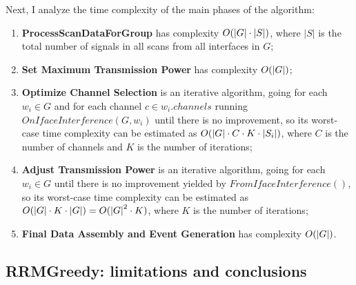 Next, I analyze the time complexity of the main phases of the algorithm:

\begin{enumerate}
    \item \textbf{ProcessScanDataForGroup} has complexity $O(\lvert{G}\rvert \cdot \lvert S \rvert)$, where $\lvert S \rvert$ is the total number of signals in all scans from all interfaces in $G$;
    \item \textbf{Set Maximum Transmission Power} has complexity $O(\lvert{G}\rvert)$;
    \item \textbf{Optimize Channel Selection} is an iterative algorithm, going for each $w_i \in G$ and for each channel $c \in w_i.channels$ running $OnIfaceInterference(G, w_i)$ until there is no improvement, so its worst-case time complexity can be estimated as $O(\lvert{G}\rvert \cdot C \cdot K \cdot \lvert{S_i}\rvert)$, where $C$ is the number of channels and $K$ is the number of iterations;
    \item \textbf{Adjust Transmission Power} is an iterative algorithm, going for each $w_i \in G$ until there is no improvement yielded by $FromIfaceInterference()$, so its worst-case time complexity can be estimated as $O(\lvert{G}\rvert \cdot K \cdot \lvert{G}\rvert) = O({\lvert{G}\rvert}^2 \cdot K)$, where $K$ is the number of iterations;
    \item \textbf{Final Data Assembly and Event Generation} has complexity $O(\lvert{G}\rvert)$.
\end{enumerate}

\subsection{RRMGreedy: limitations and conclusions}
\label{sec:flaws}

